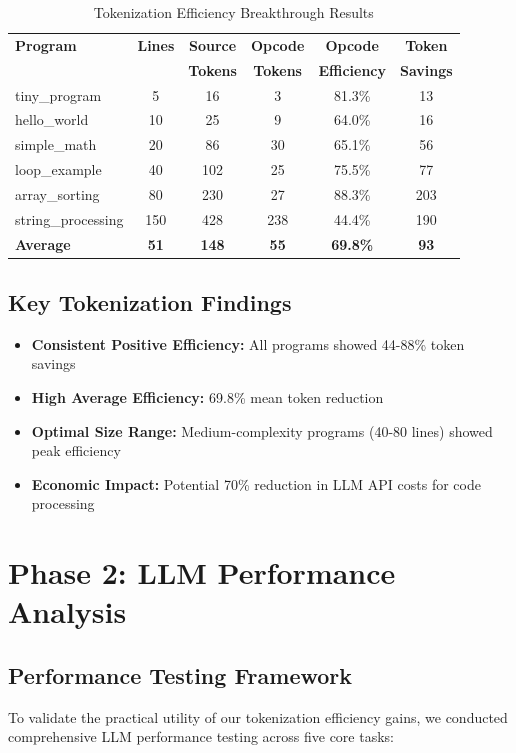\documentclass[11pt,a4paper]{article}
\begin{document}
\begin{table}[H]
\centering
\caption{Tokenization Efficiency Breakthrough Results}
\begin{tabular}{lccccc}
\toprule
\textbf{Program} & \textbf{Lines} & \textbf{Source} & \textbf{Opcode} & \textbf{Opcode} & \textbf{Token}\\
& & \textbf{Tokens} & \textbf{Tokens} & \textbf{Efficiency} & \textbf{Savings}\\
\midrule
tiny\_program & 5 & 16 & 3 & 81.3\% & 13\\
hello\_world & 10 & 25 & 9 & 64.0\% & 16\\
simple\_math & 20 & 86 & 30 & 65.1\% & 56\\
loop\_example & 40 & 102 & 25 & 75.5\% & 77\\
array\_sorting & 80 & 230 & 27 & 88.3\% & 203\\
string\_processing & 150 & 428 & 238 & 44.4\% & 190\\
\midrule
\textbf{Average} & \textbf{51} & \textbf{148} & \textbf{55} & \textbf{69.8\%} & \textbf{93}\\
\bottomrule
\end{tabular}
\end{table}

\subsection{Key Tokenization Findings}
\begin{itemize}
    \item \textbf{Consistent Positive Efficiency:} All programs showed 44-88\% token savings
    \item \textbf{High Average Efficiency:} 69.8\% mean token reduction
    \item \textbf{Optimal Size Range:} Medium-complexity programs (40-80 lines) showed peak efficiency
    \item \textbf{Economic Impact:} Potential 70\% reduction in LLM API costs for code processing
\end{itemize}

\section{Phase 2: LLM Performance Analysis}

\subsection{Performance Testing Framework}
To validate the practical utility of our tokenization efficiency gains, we conducted comprehensive LLM performance testing across five core tasks:
\end{document}
